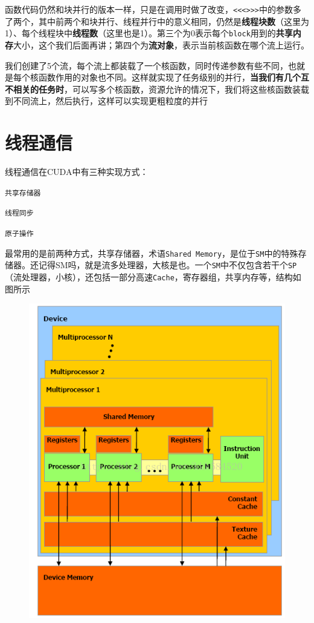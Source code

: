 \documentclass[UTF8,a4paper,12pt]{ctexbook}
\begin{document}
		函数代码仍然和块并行的版本一样，只是在调用时做了改变，\verb|<<<>>>|中的参数多了两个，其中前两个和块并行、线程并行中的意义相同，仍然是\textbf{线程块数}（这里为1）、每个线程块中\textbf{线程数}（这里也是1）。第三个为0表示每个\verb|block|用到的\textbf{共享内存}大小，这个我们后面再讲；第四个为\textbf{流对象}，表示当前核函数在哪个流上运行。
		
		我们创建了5个流，每个流上都装载了一个核函数，同时传递参数有些不同，也就是每个核函数作用的对象也不同。这样就实现了任务级别的并行，\textbf{当我们有几个互不相关的任务时}，可以写多个核函数，资源允许的情况下，我们将这些核函数装载到不同流上，然后执行，这样可以实现更粗粒度的并行
	
	\section{线程通信}
		线程通信在CUDA中有三种实现方式： 
		
				\verb|共享存储器|
				
				\verb|线程同步|
				
				\verb|原子操作|
		
			最常用的是前两种方式，共享存储器，术语\verb|Shared Memory|，是位于\verb|SM|中的特殊存储器。还记得SM吗，就是流多处理器，大核是也。一个\verb|SM|中不仅包含若干个\verb|SP|（流处理器，小核），还包括一部分高速\verb|Cache|，寄存器组，共享内存等，结构如图所示
			
			\begin{figure}[h]
				\centering
				\includegraphics[scale = 0.8]{InfoTransfer.png}
			\end{figure}
			
\end{document}
